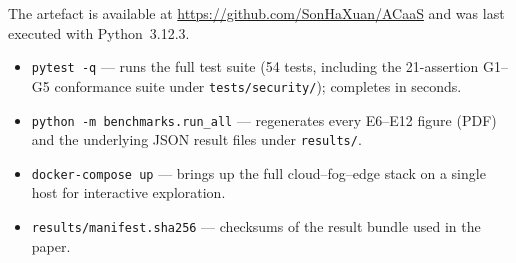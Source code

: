 \documentclass[runningheads]{llncs}
\begin{document}
The artefact is available at \url{https://github.com/SonHaXuan/ACaaS} and was last executed with Python~3.12.3.

\begin{itemize}[leftmargin=*]
  \item \texttt{pytest -q} --- runs the full test suite (54 tests, including the 21-assertion G1--G5 conformance suite under \texttt{tests/security/}); completes in seconds.
  \item \texttt{python -m benchmarks.run\_all} --- regenerates every E6--E12 figure (PDF) and the underlying JSON result files under \texttt{results/}.
  \item \texttt{docker-compose up} --- brings up the full cloud--fog--edge stack on a single host for interactive exploration.
  \item \texttt{results/manifest.sha256} --- checksums of the result bundle used in the paper.
\end{itemize}
\end{document}
